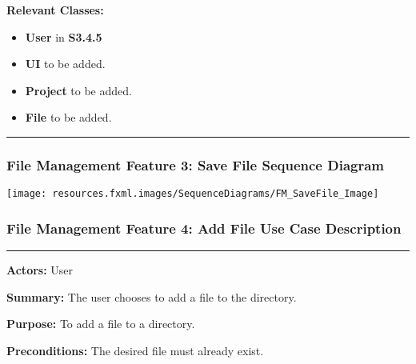 \documentclass[twoside,letterpaper]{article}
\begin{document}
\noindent\textbf{Relevant Classes:}
\begin{itemize}
	\item \textbf{User} in \textbf{S3.4.5}
	\item \textbf{UI} to be added.
	\item \textbf{Project} to be added.
	\item \textbf{File} to be added.
\end{itemize}
\vspace{8pt}
\hrule

\newpage

\subsubsection[File Management Feature 3: Save File Sequence Diagram]{\rmfamily\bfseries\color{black}
	File Management Feature 3: Save File Sequence Diagram}
\hypertarget{RefHeading22059017292}{}

\texttt{[image: resources.fxml.images/SequenceDiagrams/FM\_SaveFile\_Image]}

\newpage

\subsubsection[File Management Feature 4: Add File Use Case Description]{\rmfamily\bfseries\color{black}
	File Management Feature 4: Add File Use Case Description}
\hypertarget{RefHeading22059017292}{}

\vspace{2pt}
\hrule
\vspace{8pt}
\textbf{Actors:} User \newline

\noindent\textbf{Summary:} The user chooses to add a file to the directory. \newline

\noindent\textbf{Purpose:} To add a file to a directory. \newline

\noindent\textbf{Preconditions:} The desired file must already exist. \newline
\end{document}
